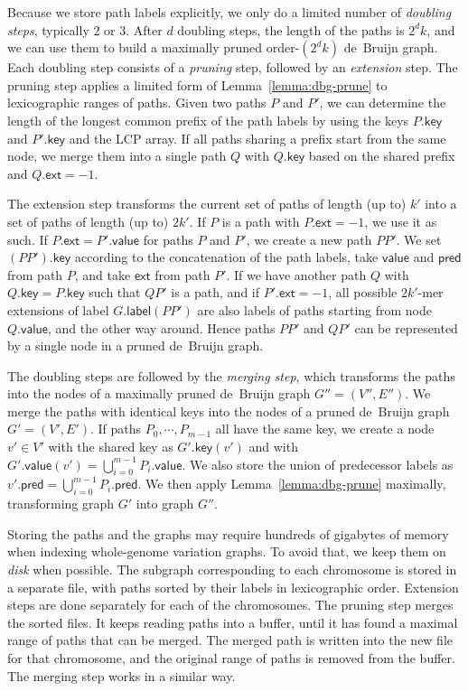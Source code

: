 \documentclass[twoside,leqno,twocolumn]{article}
\newcommand{\glabel}{\ensuremath{\mathsf{label}}}
\newcommand{\gpred}{\ensuremath{\mathsf{pred}}}
\newcommand{\gkey}{\ensuremath{\mathsf{key}}}
\newcommand{\gvalue}{\ensuremath{\mathsf{value}}}
\newcommand{\gext}{\ensuremath{\mathsf{ext}}}
\newcommand{\kmer}[1]{$#1$\nobreakdash-mer}
\newcommand{\orderk}[1]{order\nobreakdash-$#1$}
\begin{document}
Because we store path labels explicitly, we only do a limited number of \emph{doubling steps}, typically $2$ or $3$. After $d$ doubling steps, the length of the paths is $2^{d} k$, and we can use them to build a maximally pruned \orderk{(2^{d} k)} de~Bruijn graph. Each doubling step consists of a \emph{pruning} step, followed by an \emph{extension} step. The pruning step applies a limited form of Lemma~\ref{lemma:dbg-prune} to lexicographic ranges of paths. Given two paths $P$ and $P'$, we can determine the length of the longest common prefix of the path labels by using the keys $P.\gkey$ and $P'.\gkey$ and the LCP array. If all paths sharing a prefix start from the same node, we merge them into a single path $Q$ with $Q.\gkey$ based on the shared prefix and $Q.\gext = -1$.

The extension step transforms the current set of paths of length (up to) $k'$ into a set of paths of length (up to) $2k'$. If $P$ is a path with $P.\gext = -1$, we use it as such. If $P.\gext = P'.\gvalue$ for paths $P$ and $P'$, we create a new path $PP'$. We set $(PP').\gkey$ according to the concatenation of the path labels, take $\gvalue$ and $\gpred$ from path $P$, and take $\gext$ from path $P'$. If we have another path $Q$ with $Q.\gkey = P.\gkey$ such that $QP'$ is a path, and if $P'.\gext = -1$, all possible \kmer{2k'} extensions of label $G.\glabel(PP')$ are also labels of paths starting from node $Q.\gvalue$, and the other way around. Hence paths $PP'$ and $QP'$ can be represented by a single node in a pruned de~Bruijn graph.

The doubling steps are followed by the \emph{merging step}, which transforms the paths into the nodes of a maximally pruned de~Bruijn graph $G'' = (V'', E'')$. We merge the paths with identical keys into the nodes of a pruned de~Bruijn graph $G' = (V', E')$. If paths $P_{0}, \dotsm, P_{m-1}$ all have the same key, we create a node $v' \in V'$ with the shared key as $G'.\gkey(v')$ and with $G'.\gvalue(v') = \bigcup_{i=0}^{m-1} P_{i}.\gvalue$. We also store the union of predecessor labels as $v'.\gpred = \bigcup_{i=0}^{m-1} P_{i}.\gpred$. We then apply Lemma~\ref{lemma:dbg-prune} maximally, transforming graph $G'$ into graph $G''$.

Storing the paths and the graphs may require hundreds of gigabytes of memory when indexing whole-genome variation graphs. To avoid that, we keep them on \emph{disk} when possible. The subgraph corresponding to each chromosome is stored in a separate file, with paths sorted by their labels in lexicographic order. Extension steps are done separately for each of the chromosomes. The pruning step merges the sorted files. It keeps reading paths into a buffer, until it has found a maximal range of paths that can be merged. The merged path is written into the new file for that chromosome, and the original range of paths is removed from the buffer. The merging step works in a similar way.
\end{document}
